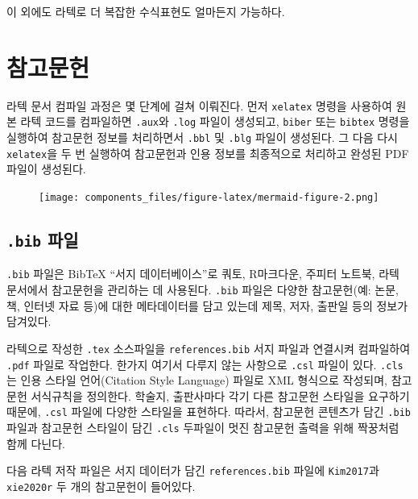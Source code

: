 \documentclass[
  letterpaper,
]{book}
\begin{document}
이 외에도 라텍로 더 복잡한 수식표현도 얼마든지 가능하다.

\hypertarget{uxcc38uxace0uxbb38uxd5cc}{%
\section{참고문헌}\label{uxcc38uxace0uxbb38uxd5cc}}

라텍 문서 컴파일 과정은 몇 단계에 걸쳐 이뤄진다. 먼저 \texttt{xelatex}
명령을 사용하여 원본 라텍 코드를 컴파일하면 \texttt{.aux}와
\texttt{.log} 파일이 생성되고, \texttt{biber} 또는 \texttt{bibtex}
명령을 실행하여 참고문헌 정보를 처리하면서 \texttt{.bbl} 및
\texttt{.blg} 파일이 생성된다. 그 다음 다시 \texttt{xelatex}을 두 번
실행하여 참고문헌과 인용 정보를 최종적으로 처리하고 완성된 PDF 파일이
생성된다.

\begin{figure}[H]

{\centering \texttt{[image: components\_files/figure-latex/mermaid-figure-2.png]}

}

\end{figure}

\hypertarget{bib-uxd30cuxc77c}{%
\subsection{\texorpdfstring{\texttt{.bib}
파일}{.bib 파일}}\label{bib-uxd30cuxc77c}}

\texttt{.bib} 파일은 BibTeX ``서지 데이터베이스''로 쿼토, R마크다운,
주피터 노트북, 라텍 문서에서 참고문헌을 관리하는 데 사용된다.
\texttt{.bib} 파일은 다양한 참고문헌(예: 논문, 책, 인터넷 자료 등)에
대한 메타데이터를 담고 있는데 제목, 저자, 출판일 등의 정보가 담겨있다.

라텍으로 작성한 \texttt{.tex} 소스파일을 \texttt{references.bib} 서지
파일과 연결시켜 컴파일하여 \texttt{.pdf} 파일로 작업한다. 한가지 여기서
다루지 않는 사항으로 \texttt{.csl} 파일이 있다. \texttt{.cls}는 인용
스타일 언어(Citation Style Language) 파일로 XML 형식으로 작성되며,
참고문헌 서식규칙을 정의한다. 학술지, 출판사마다 각기 다른 참고문헌
스타일을 요구하기 때문에, \texttt{.csl} 파일에 다양한 스타일을 표현하다.
따라서, 참고문헌 콘텐츠가 담긴 \texttt{.bib} 파일과 참고문헌 스타일이
담긴 \texttt{.cls} 두파일이 멋진 참고문헌 출력을 위해 짝꿍처럼 함께
다닌다.

다음 라텍 저작 파일은 서지 데이터가 담긴 \texttt{references.bib} 파일에
\texttt{Kim2017}과 \texttt{xie2020r} 두 개의 참고문헌이 들어있다.
\end{document}
